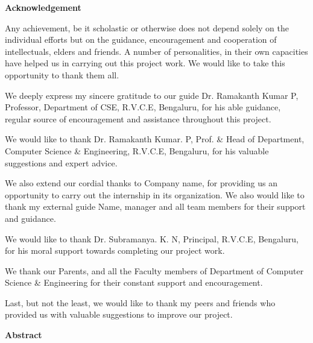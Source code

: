 \cleardoublepage




\begin{center}
	\huge\bfseries Acknowledgement
\end{center}

\bigskip

Any achievement, be it scholastic or otherwise does not depend solely on the individual efforts
but on the guidance, encouragement and cooperation of intellectuals, elders and friends.
A number of personalities, in their own capacities have helped us in carrying out this project work.
We would like to take this opportunity to thank them all. \bigskip

We deeply express my sincere gratitude to our guide Dr. Ramakanth Kumar P, Professor,
Department of CSE, R.V.C.E, Bengaluru, for his able guidance, regular source of encouragement and assistance
throughout this project. \bigskip

We would like to thank Dr. Ramakanth Kumar. P, Prof. \& Head of Department,
Computer Science \& Engineering, R.V.C.E, Bengaluru, for his valuable suggestions and expert advice.\bigskip

We also extend our cordial thanks to Company name, for providing us an opportunity to carry out the internship in its organization. We also would like to thank my external guide Name, manager and all team members for their support and guidance.\bigskip

We would like to thank Dr. Subramanya. K. N, Principal, R.V.C.E, Bengaluru, for his moral support towards completing our project work.\bigskip

We thank our Parents, and all the Faculty members of Department of
Computer Science \& Engineering for their constant support and encouragement.\bigskip

Last, but not the least, we would like to thank my peers and friends who
provided us with valuable suggestions to improve our project.

\pagebreak

\begin{center}
	\huge\bfseries Abstract


\end{center}

\bigskip



\pagebreak

\cleardoublepage

\tableofcontents
\listoffigures
\listoftables
\printglossary[type=\acronymtype,style=long,title=Glossary,nonumberlist]

\cleardoublepage